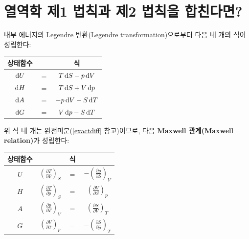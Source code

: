     \section{열역학 제1 법칙과 제2 법칙을 합친다면?}\label{dudhdadg}
        내부 에너지의 Legendre 변환(Legendre transformation)으로부터 다음 네 개의 식이 성립한다:
        \begin{table}[H]
        \centering
            \begin{tabular}{ c c c }
                \hline
                \rowcolor{lightgray}
                상태함수& &식\\
                \hline
                $\operatorname{d\!} U$ & $=$ & $T \operatorname{d\!} S - p\operatorname{d\!} V$ \\
                $\operatorname{d\!} H$ & $=$ & $T \operatorname{d\!} S + V\operatorname{d\!} p$ \\
                $\operatorname{d\!} A$ & $=$ & $-p \operatorname{d\!} V - S \operatorname{d\!} T$ \\
                $\operatorname{d\!} G$ & $=$ & $V\operatorname{d\!} p - S \operatorname{d\!} T$ \\
                \hline
            \end{tabular}
        \end{table}
        위 식 네 개는 완전미분(\ref{exactdiff} 참고)이므로, 다음 \textbf{Maxwell 관계(Maxwell relation)}가 성립한다:
        \begin{table}[H]
        \centering
            \begin{tabular}{ c|c c c }
                \hline
                \rowcolor{lightgray}
                상태함수& &식& \\
                \hline
                $U$ & $\displaystyle \left(\frac{\partial T}{\partial V}\right)_S$ & $\displaystyle =$ & $\displaystyle -\left(\frac{\partial p}{\partial S}\right)_V$ \\
                $H$ & $\displaystyle \left(\frac{\partial T}{\partial p}\right)_S$ & $\displaystyle =$ & $\displaystyle \left(\frac{\partial V}{\partial S}\right)_p$ \\
                $A$ & $\displaystyle \left(\frac{\partial p}{\partial T}\right)_V$ & $\displaystyle =$ & $\displaystyle \left(\frac{\partial S}{\partial V}\right)_T$ \\
                $G$ & $\displaystyle \left(\frac{\partial V}{\partial T}\right)_p$ & $\displaystyle =$ & $\displaystyle -\left(\frac{\partial S}{\partial p}\right)_T$ \\
                \hline
            \end{tabular}
        \end{table}
